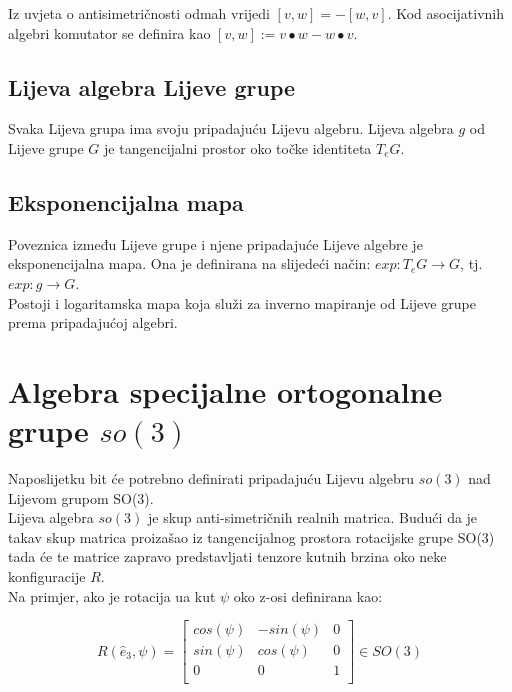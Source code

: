 \documentclass[times, utf8, diplomski]{fer}
\begin{document}
	Iz uvjeta o antisimetričnosti odmah vrijedi $[v,w]=-[w,v]$. Kod asocijativnih algebri komutator se definira kao $[v,w]:=v \bullet w - w \bullet v$.
	
	\subsection{Lijeva algebra Lijeve grupe} Svaka Lijeva grupa ima svoju pripadajuću Lijevu algebru. Lijeva algebra $g$ od Lijeve grupe $G$ je tangencijalni prostor oko točke identiteta $T_e G$.
	
	\subsection{Eksponencijalna mapa} Poveznica između Lijeve grupe i njene pripadajuće Lijeve algebre je eksponencijalna mapa. Ona je definirana na slijedeći način: $exp: T_eG \rightarrow	G$, tj. $exp: g \rightarrow G.$ \\ Postoji i logaritamska mapa koja služi za inverno mapiranje od Lijeve grupe prema pripadajućoj algebri.

\section{Algebra specijalne ortogonalne grupe $so(3)$}

	Naposlijetku bit će potrebno definirati pripadajuću Lijevu algebru $so(3)$ nad Lijevom grupom SO(3). \\
	Lijeva algebra $so(3)$ je skup anti-simetričnih realnih matrica. Budući da je takav skup matrica proizašao iz tangencijalnog prostora rotacijske grupe SO(3) tada će te matrice zapravo predstavljati tenzore kutnih brzina oko neke konfiguracije $R$. \\
	Na primjer, ako je rotacija ua kut $\psi$ oko z-osi definirana kao:
	
	\begin{equation}
		R( \hat{e}_3, \psi ) = 
		\begin{bmatrix}
			cos(\psi)	&	-sin(\psi)	&	0 \\
			sin(\psi)	&	cos(\psi)	&	0 \\
			0			&	0			&	1 \\	
		\end{bmatrix} \in SO(3)
	\end{equation}
	
	\newpage
	\clearpage
	
\end{document}
